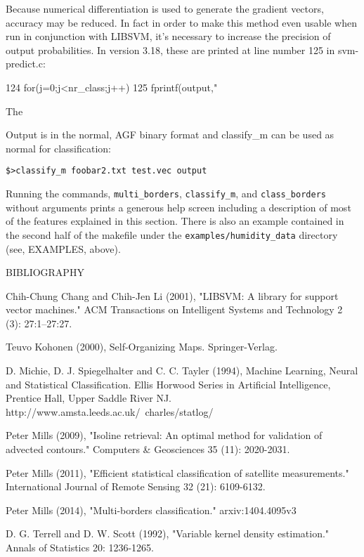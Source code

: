 \documentclass[12pt]{article}
\begin{document}
Because numerical differentiation is used to generate the gradient vectors, accuracy may be reduced.  In fact in order to make this method even usable when run in conjunction with LIBSVM, it's necessary to increase the precision of output probabilities.  In version 3.18, these are printed at line number 125 in svm-predict.c:

124		for(j=0;j<nr_class;j++)
125			fprintf(output," %

The %

Output is in the normal, AGF binary format and classify_m can be used as normal for classification:

\begin{verbatim}
$>classify_m foobar2.txt test.vec output
\end{verbatim}

Running the commands, \verb"multi_borders", \verb"classify_m", and \verb"class_borders" without arguments prints a generous help screen including a description of most of the features explained in this section.  There is also an example contained in the second half of the makefile under the \verb"examples/humidity_data" directory (see, EXAMPLES, above).


BIBLIOGRAPHY

Chih-Chung Chang and Chih-Jen Li (2001), "LIBSVM: A library for support vector machines." ACM Transactions on Intelligent Systems and Technology 2 (3): 27:1--27:27.

Teuvo Kohonen (2000), Self-Organizing Maps. Springer-Verlag.

D. Michie, D. J. Spiegelhalter and C. C. Tayler (1994), Machine Learning, Neural and Statistical Classification.  Ellis Horwood Series in Artificial Intelligence, Prentice Hall, Upper Saddle River NJ. http://www.amsta.leeds.ac.uk/~charles/statlog/

Peter Mills (2009), "Isoline retrieval: An optimal method for validation of advected contours." Computers & Geosciences 35 (11): 2020-2031.

Peter Mills (2011), "Efficient statistical classification of satellite measurements." International Journal of Remote Sensing 32 (21): 6109-6132.

Peter Mills (2014), "Multi-borders classification."  arxiv:1404.4095v3

D. G. Terrell and D. W. Scott (1992), "Variable kernel density estimation."  Annals of Statistics 20: 1236-1265.
\end{document}
